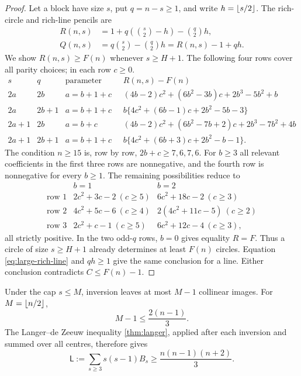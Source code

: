 \begin{proof}
Let a block have size $s$, put $q=n-s\geq1$, and write
$h=\left\lfloor s/2\right\rfloor$.  The rich-circle and rich-line pencils are
\begin{align}
 R(n,s)&=1+q\left(\binom s2-h\right)-\binom q2h,   \label{eq:large-rich-circle}\\
 Q(n,s)&=q\binom s2-\binom q2h=R(n,s)-1+qh.        \label{eq:large-rich-line}
\end{align}
We show $R(n,s)\geq F(n)$ whenever $s\geq H+1$.  The following four rows
cover all parity choices; in each row $c\geq0$.
\[
\begin{array}{c|c|c|l}
s&q&\text{parameter relation}&R(n,s)-F(n)\\ \hline
2a&2b&a=b+1+c&
(4b-2)c^2+(6b^2-3b)c+2b^3-5b^2+b\\
2a&2b+1&a=b+1+c&
b\{4c^2+(6b-1)c+2b^2-5b-3\}\\
2a+1&2b&a=b+c&
(4b-2)c^2+(6b^2-7b+2)c+2b^3-7b^2+4b\\
2a+1&2b+1&a=b+1+c&
b\{4c^2+(6b+3)c+2b^2-b-1\}.
\end{array}                                                    \tag{*}
\]
The condition $n\geq15$ is, row by row,
\(2b+c\geq7,6,7,6\).  For $b\geq3$ all relevant coefficients in the
first three rows are nonnegative, and the fourth row is nonnegative for
every $b\geq1$.  The remaining possibilities reduce to
\[
\begin{array}{c|cc}
&b=1&b=2\\ \hline
\text{row 1}&2c^2+3c-2\ (c\geq5)&6c^2+18c-2\ (c\geq3)\\
\text{row 2}&4c^2+5c-6\ (c\geq4)&2(4c^2+11c-5)\ (c\geq2)\\
\text{row 3}&2c^2+c-1\ (c\geq5)&6c^2+12c-4\ (c\geq3),
\end{array}
\]
all strictly positive.  In the two odd-$q$ rows, $b=0$ gives equality
$R=F$.  Thus a circle of size $s\geq H+1$ already determines at least
$F(n)$ circles.  Equation \eqref{eq:large-rich-line} and $qh\geq1$ give
the same conclusion for a line.  Either conclusion contradicts
$C\leq F(n)-1$.
\end{proof}

Under the cap $s\leq M$, inversion leaves at most $M-1$ collinear images.
For $M=\left\lfloor n/2\right\rfloor$,
\[
 M-1\leq\frac{2(n-1)}3.
\]
The Langer--de Zeeuw inequality \cref{thm:langer}, applied after each
inversion and summed over all centres, therefore gives
\begin{equation}
 \mathsf L:=\sum_{s\geq3}s(s-1)B_s
 \geq\frac{n(n-1)(n+2)}3.                          \label{eq:large-L}
\end{equation}

